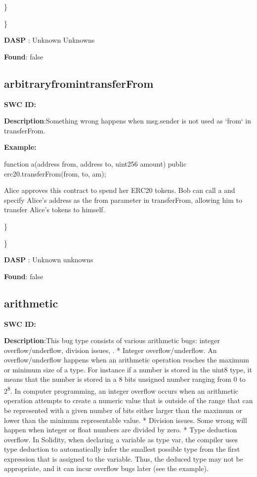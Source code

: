 \documentclass{article}
\begin{document}
\} 

\} 

\textbf{DASP} : Unknown Unknowns

\textbf{Found}: false

\subsection{arbitrary\textunderscore from\textunderscore in\textunderscore transferFrom} 
\textbf{SWC \textunderscore ID:} 

\textbf{Description}:Something wrong happens when msg.sender is not used as `from` in transferFrom.


\textbf{Example:} 

function a(address from, address to, uint256 amount) public {
  erc20.transferFrom(from, to, am);
}

Alice approves this contract to spend her ERC20 tokens. Bob can call a and specify Alice's address as the from parameter in transferFrom, allowing him to transfer Alice's tokens to himself.

\} 

\} 

\textbf{DASP} : Unknown unknowns

\textbf{Found}: false

\subsection{arithmetic} 
\textbf{SWC \textunderscore ID:} 

\textbf{Description}:This bug type consists of various arithmetic bugs: integer overflow/underflow, division issues, .
* Integer overflow/underflow. An overflow/underflow happens when an arithmetic operation reaches the maximum or minimum size of a type. For instance if a number is stored in the uint8 type, it means that the number is stored in a 8 bits unsigned number ranging from 0 to 2\textsuperscript8. In computer programming, an integer overflow occurs when an arithmetic operation attempts to create a numeric value that is outside of the range that can be represented with a given number of bits either larger than the maximum or lower than the minimum representable value.
* Division issues. Some wrong will happen when integer or float numbers are divided by zero.
* Type deduction overflow. In Solidity, when declaring a variable as type var, the compiler uses type deduction to automatically infer the smallest possible type from the first expression that is assigned to the variable. Thus, the deduced type may not be appropriate, and it can incur overflow bugs later (see the example).
\end{document}
